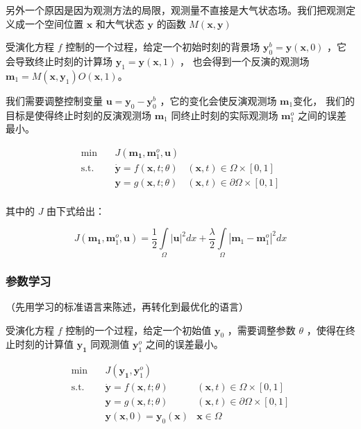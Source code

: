 \documentclass[a4paper,12pt]{article}
\begin{document}
另外一个原因是因为观测方法的局限，观测量不直接是大气状态场。我们把观测定义成一个空间位置 $ \mathbf{x} $ 和大气状态 $ \mathbf{y} $ 的函数 $ M(\mathbf{x}, \mathbf{y}) $

受演化方程 $ f $ 控制的一个过程，给定一个初始时刻的背景场 $ \mathbf{y}_0^b = \mathbf{y}(\mathbf{x}, 0) $ ，它会导致终止时刻的计算场 $ \mathbf{y}_1 = \mathbf{y}(\mathbf{x}, 1) $ ，
也会得到一个反演的观测场 $ \mathbf{m}_1 = M(\mathbf{x}, \mathbf{y}_1) O(\mathbf{x}, 1) $。

我们需要调整控制变量 $ \mathbf{u} = \mathbf{y}_0 - \mathbf{y}_0^b $ ，它的变化会使反演观测场 $ \mathbf{m}_1 $变化，
我们的目标是使得终止时刻的反演观测场 $ \mathbf{m}_1 $ 同终止时刻的实际观测场 $ \mathbf{m}_1^o $ 之间的误差最小。

$$
\begin{array}{rcll}
\min &~& J(\mathbf{m_1}, \mathbf{m}_1^o, \mathbf{u}) & \\
\mathrm{s.t.} &~& \dot{\mathbf{y}} = f(\mathbf{x}, t; \theta) & (\mathbf{x}, t) \in \Omega \times [0, 1] \\
&~& \mathbf{y} = g(\mathbf{x}, t; \theta) & (\mathbf{x}, t) \in \partial \Omega \times [0, 1] \\
\end{array}
$$

其中的 $ J $ 由下式给出：

$$
J(\mathbf{m_1}, \mathbf{m}_1^o, \mathbf{u}) = \frac{1}{2} \int\limits_{\Omega}|\mathbf{u}|^2 dx + \frac{\lambda}{2} \int\limits_{\Omega}|\mathbf{m}_1 - \mathbf{m}_1^o|^2 dx
$$

\subsubsection{参数学习}

（先用学习的标准语言来陈述，再转化到最优化的语言）

受演化方程 $ f $ 控制的一个过程，给定一个初始值 $ \mathbf{y}_0 $ ，需要调整参数 $ \theta $ ，使得在终止时刻的计算值 $ \mathbf{y_1} $ 同观测值 $ \mathbf{y}_1^o $ 之间的误差最小。

$$
\begin{array}{rcll}
\min &~& J(\mathbf{y_1}, \mathbf{y}_1^o) & \\
\mathrm{s.t.} &~& \dot{\mathbf{y}} = f(\mathbf{x}, t; \theta) & (\mathbf{x}, t) \in \Omega \times [0, 1] \\
&~& \mathbf{y} = g(\mathbf{x}, t; \theta) & (\mathbf{x}, t) \in \partial \Omega \times [0, 1] \\
&~& \mathbf{y}(\mathbf{x}, 0) = \mathbf{y}_0(\mathbf{x}) & \mathbf{x} \in \Omega
\end{array}
$$
\end{document}
